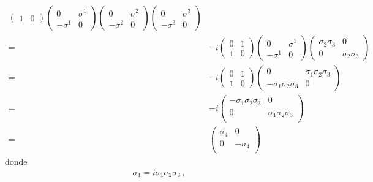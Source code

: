\begin{frame}
\begin{align}
\begin{pmatrix}
1 & 0  
\end{pmatrix}
\begin{pmatrix}
0 & \sigma^1\\
-\sigma^1 & 0  
\end{pmatrix}
\begin{pmatrix}
0 & \sigma^2\\
-\sigma^2 & 0  
\end{pmatrix}
\begin{pmatrix}
0 & \sigma^3\\
-\sigma^3 & 0  
\end{pmatrix}\nonumber\\
=&-i\begin{pmatrix}
0 & 1\\
1 & 0  
\end{pmatrix}
\begin{pmatrix}
0 & \sigma^1\\
-\sigma^1 & 0  
\end{pmatrix}
\begin{pmatrix}
\sigma_2\sigma_3 & 0\\
0 & \sigma_2\sigma_3
\end{pmatrix}\nonumber\\
=&-i\begin{pmatrix}
0 & 1\\
1 & 0  
\end{pmatrix}
\begin{pmatrix}
0 & \sigma_1\sigma_2\sigma_3 \\
-\sigma_1\sigma_2\sigma_3 & 0
\end{pmatrix}\nonumber\\
=&-i\begin{pmatrix}
-\sigma_1\sigma_2\sigma_3 & 0 \\
0 &\sigma_1\sigma_2\sigma_3\\
\end{pmatrix}\nonumber\\
=&\begin{pmatrix}
\sigma_4 & 0 \\
0 &-\sigma_4\\
\end{pmatrix}
\end{align}
donde
\begin{align}
  \sigma_4=i\sigma_1\sigma_2\sigma_3\,,
\end{align}


\end{frame}
